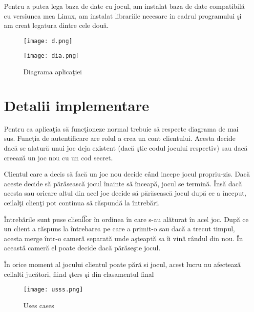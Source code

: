 \documentclass[11pt,leqno, runningheads]{llncs}
\begin{document}
Pentru a putea lega baza de date cu jocul, am instalat baza de date compatibil\u a cu versiunea mea Linux, am instalat librariile necesare in cadrul programului \c si am creat legatura dintre cele dou\u a. 



\begin{figure}[!h]
  \texttt{[image: d.png]}
  \centering
  \caption{}
\end{figure}


\begin{figure}[!h]
  \texttt{[image: dia.png]}
  \centering
  \caption{Diagrama aplica\c tiei}
\end{figure}

\vspace{1 cm}
\newpage
\section{Detalii implementare}

\hspace{1 cm}Pentru ca aplica\c tia s\u a func\c tioneze normal trebuie s\u a respecte diagrama de mai sus. 
Func\c tia de autentificare are rolul a crea un cont clientului. Acesta decide dac\u a se alatur\u a unui joc deja existent (dac\u a \c stie codul jocului respectiv) sau dac\u a creeaz\u a un joc nou cu un cod secret.

Clientul care a decis s\u a fac\u a un joc nou decide c\^{a}nd incepe jocul propriu-zis. Dac\u a aceste decide s\u a p\u ar\u aseasc\u a jocul \^{i}nainte s\u a \^{i}nceap\u a, jocul se termin\u a. \^{I}ns\u a dac\u a acesta sau oricare altul din acel joc decide s\u a p\u ar\u aseasc\u a jocul dup\u a ce a \^{i}nceput, ceilal\c ti clien\c ti pot continua s\u a r\u aspund\u a la \^{i}ntreb\u ari.

\^{I}ntreb\u arile sunt puse clien\t ilor \^{i}n ordinea \^{i}n care s-au al\u aturat \^{i}n acel joc. Dup\u a ce un client a r\u aspuns la \^{i}ntrebarea pe care a primit-o sau dac\u a a trecut timpul, acesta merge \^{i}ntr-o camer\u a separat\u a unde a\c steapt\u a sa \^{i}i vin\u a r\^{a}ndul din nou. \^{I}n aceast\u a camer\u a el poate decide dac\u a p\u ar\u ase\c ste jocul.

\^{I}n orice moment al jocului clientul poate p\u ar\u a si jocul, acest lucru nu afecteaz\u a ceilalti juc\u atori, fiind \c sters \c si din clasamentul final

\begin{figure}[!h]
  \texttt{[image: usss.png]}
  \centering
  \caption{Uses cases}
\end{figure} 
\end{document}
